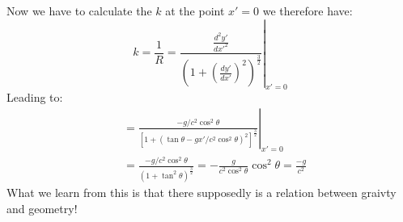 \documentclass[10pt,a4paper]{article}
\begin{document}
\begin{itemize}
          Now we have to calculate the $k$ at the point $x'=0$ we therefore have:
          \begin{equation}
               k  = \frac 1R = \left.\frac{\frac{d^2y'}{dx'^2}}{\left(1+\left(
                    \frac{dy'}{dx'}
               \right)^2\right)^{\frac32}}\right|_{x'=0}
          \end{equation}
          Leading to:
          \begin{align}
               &=\left.\frac{-g/c^2\cos^2\theta}{\left[ 1+(\tan\theta - gx'/c^2\cos^2\theta)^2\right]^{\frac32}}\right|_{x'=0} \\
               &=\frac{-g/c^2\cos^2\theta}{(1+\tan^2\theta)^{\frac32}}= -\frac{g}{c^2\cos^2\theta}\cos^2\theta= \frac{-g}{c^2}
          \end{align}
          What we learn from this is that there supposedly is a relation between graivty and geometry!
     \end{itemize}
\end{document}
